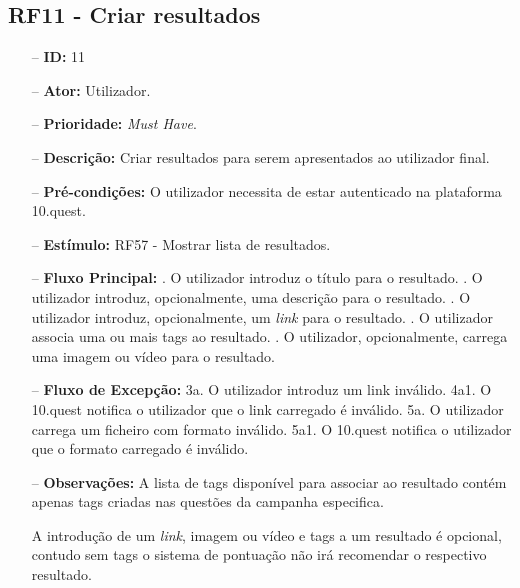 \subsection{RF11 - Criar resultados}
\begin{itemize}
	\item[--] \textbf{ID:} 11
	\item[--]  \textbf{Ator:} Utilizador.
	\item[--]  \textbf{Prioridade:} \textit{Must Have}.
	\item[--]  \textbf{Descrição:} Criar resultados para serem apresentados ao utilizador final.
	\item[--]  \textbf{Pré-condições:} O utilizador necessita de estar autenticado na plataforma 10.quest.
	\item[--]  \textbf{Estímulo:}  
		\subitem RF57 - Mostrar lista de resultados.
	\item[--]  \textbf{Fluxo Principal:} 
		. O utilizador introduz o título para o resultado.
		. O utilizador introduz, opcionalmente, uma descrição para o resultado.
		. O utilizador introduz, opcionalmente, um \textit{link} para o resultado.
		. O utilizador associa uma ou mais tags ao resultado.
		. O utilizador, opcionalmente, carrega uma imagem ou vídeo para o resultado.
	\item[--]  \textbf{Fluxo de Excepção:} 
		\subitem 3a. O utilizador introduz um link inválido.
		\subitem 4a1. O 10.quest notifica o utilizador que o link carregado é inválido.
		\subitem 5a. O utilizador carrega um ficheiro com formato inválido.
		\subitem 5a1. O 10.quest notifica o utilizador que o formato carregado é inválido.
	\item[--]  \textbf{Observações:} 
	A lista de tags disponível para associar ao resultado contém apenas tags criadas nas questões da campanha especifica.
	
	A introdução de um \textit{link}, imagem ou vídeo e tags a um resultado é opcional, contudo sem tags o sistema de pontuação não irá recomendar o respectivo resultado.	
	
\end{itemize}
\newpage

